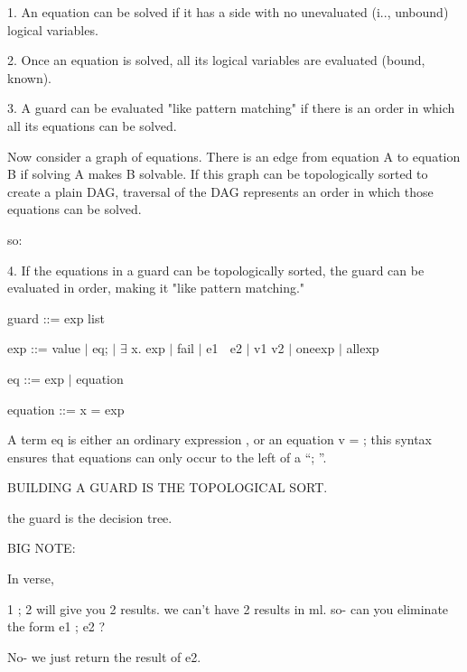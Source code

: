 \documentclass{article}
\begin{document}
1. An equation can be solved if it has a side with no unevaluated (i.\expr.,
unbound) logical variables. 

2. Once an equation is solved, all its logical variables are evaluated (bound,
known). 

3. A guard can be evaluated "like pattern matching" if there is an order in
which all its equations can be solved. 

Now consider a graph of equations.  There is an edge from
equation A to equation B if solving A makes B solvable.  If this graph can 
be topologically sorted to create a plain DAG, traversal of the DAG represents
an order in which those equations can be solved. 

so: 

4. If the equations in a guard can be topologically sorted, the guard can be 
   evaluated in order, making it "like pattern matching." 

guard ::= exp list 

exp ::= value $\vert$ eq; \expr $\vert$ $\exists$ x. exp $\vert$ fail $\vert$ e1
\choice $\;$ e2 $\vert$ v1 v2 $\vert$ one{exp} $\vert$ all{exp}

eq ::= exp $\vert$ equation 

equation ::= x = exp 


A term eq is either an ordinary expression \expr, or an equation v = \expr; this syntax
ensures that equations can only occur to the left of a “; ”. 


BUILDING A GUARD IS THE TOPOLOGICAL SORT. 

the guard is the decision tree. 

BIG NOTE: 

In verse, 

1 ; 2 will give you 2 results. we can't have 2 results in ml. 
so- can you eliminate the form e1 ; e2 ? 

No- we just return the result of e2. 

\end{document}
